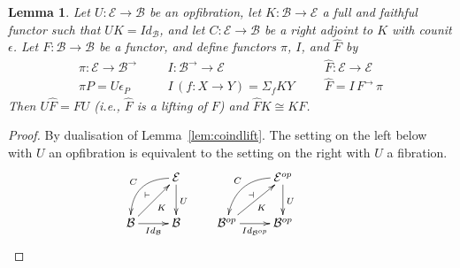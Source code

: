 \documentclass{LMCS}
\newcommand{\ra}{\rightarrow}
\newcommand\E{{\mathcal E}}
\newcommand\B{{\mathcal B}}
\theoremstyle{plain}
\newtheorem{lemma}[theorem]{Lemma}
\theoremstyle{remark}
\theoremstyle{definition}
\begin{document}
\begin{lemma}\label{lem:indlift}
  Let $U:\E\to\B$ be an opfibration, let $K:\B\to\E$ a full and
  faithful functor such that $U K = Id_\B$, and let $C:\E\to\B$ be a
  right adjoint to $K$ with counit $\epsilon$. Let $F : \B \to \B$ be
  a functor, and define functors $\pi$, $I$, and $\hat{F}$ by
\[\begin{array}{lll}
  \pi:\E\to\B^\to & \;\;\;\;\;\; I:\B^\to\to\E & \;\;\;\;\;\; \hat
  F : \E\to\E\\ 
  \pi P = U \epsilon_P &\;\;\;\;\;\; I\,(f: X \ra Y) = \Sigma_f K Y &
  \;\;\;\;\;\;\hat F = I\, F^\ra \, \pi
\end{array}\]
Then $U \hat{F} = F U$ (i.e., $\hat F$ is a lifting of $F$) and $\hat
F K \cong K F$.
\end{lemma}
\begin{proof}
  By dualisation of Lemma~\ref{lem:coindlift}. The setting on the left
  below with $U$ an opfibration is equivalent to the setting on the
  right with $U$ a fibration.
  \[\xymatrix{ \ar@{}"1,2"-<10px,0px>;"2,1"+<0px,10px>|\vdash &
    \ar@/_1.2pc/[ld]_C \E \ar[d]^{U} &
    \ar@{}"1,2"-<10px,0px>;"2,1"+<168px,10px>|\dashv &
    \ar@/_1.2pc/[ld]_C \E^{op} \ar[d]^{U}\\ \B \ar[ru]_K
    \ar[r]_{Id_\B} & \B & \B^{op} \ar[ru]_K \ar[r]_{Id_{\B^{op}}} &
    \B^{op}} \]
\end{proof}
\end{document}
